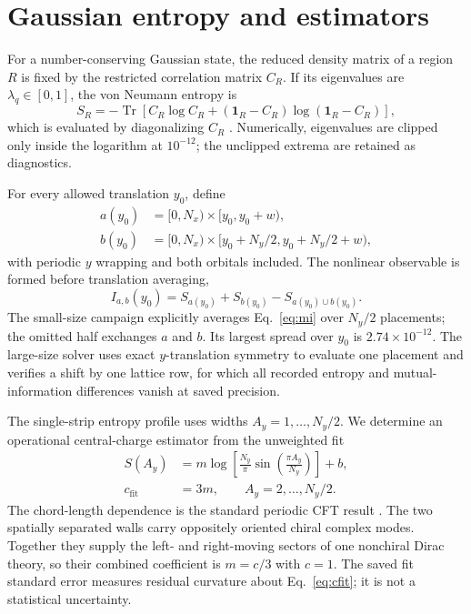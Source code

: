 \documentclass[aps,prb,twocolumn,nofootinbib,superscriptaddress,floatfix]{revtex4-2}
\newcommand{\Tr}{\operatorname{Tr}}
\newcommand{\cfit}{c_{\mathrm{fit}}}
\newcommand{\Iab}{I_{a,b}}
\begin{document}
\section{Gaussian entropy and estimators}
\label{sec:estimators}

For a number-conserving Gaussian state, the reduced density matrix of a region
$R$ is fixed by the restricted correlation matrix $C_R$.  If its eigenvalues
are $\lambda_q\in[0,1]$, the von Neumann entropy is
\begin{equation}
 S_R=-\Tr\left[C_R\log C_R+
 (\mathbf{1}_R-C_R)\log(\mathbf{1}_R-C_R)\right],
 \label{eq:gaussianentropy}
\end{equation}
which is evaluated by diagonalizing $C_R$ \cite{Peschel2003,PeschelEisler2009}.
Numerically, eigenvalues are clipped only inside the logarithm at
$10^{-12}$; the unclipped extrema are retained as diagnostics.

For every allowed translation $y_0$, define
\begin{align}
 a(y_0)&=[0,N_x)\times[y_0,y_0+w),
 \\
 b(y_0)&=[0,N_x)\times
 [y_0+N_y/2,y_0+N_y/2+w),
 \label{eq:strips}
\end{align}
with periodic $y$ wrapping and both orbitals included.  The nonlinear
observable is formed before translation averaging,
\begin{equation}
 \Iab(y_0)=S_{a(y_0)}+S_{b(y_0)}-S_{a(y_0)\cup b(y_0)}.
 \label{eq:mi}
\end{equation}
The small-size campaign explicitly averages Eq.~\eqref{eq:mi} over
$N_y/2$ placements; the omitted half exchanges $a$ and $b$.  Its largest
spread over $y_0$ is $2.74\times10^{-12}$.  The large-size solver uses exact
$y$-translation symmetry to evaluate one placement and verifies a shift by
one lattice row, for which all recorded entropy and mutual-information
differences vanish at saved precision.

The single-strip entropy profile uses widths
$A_y=1,\ldots,N_y/2$.  We determine an operational central-charge estimator
from the unweighted fit
\begin{align}
 S(A_y)&=m\log\left[
 \frac{N_y}{\pi}\sin\left(\frac{\pi A_y}{N_y}\right)
 \right]+b,
 \\
 \cfit&=3m,
 \qquad A_y=2,\ldots,N_y/2.
 \label{eq:cfit}
\end{align}
The chord-length dependence is the standard periodic CFT result
\cite{CalabreseCardy2004}.  The two spatially separated walls carry oppositely
oriented chiral complex modes.  Together they supply the left- and right-moving
sectors of one nonchiral Dirac theory, so their combined coefficient is
$m=c/3$ with $c=1$.  The saved fit standard error measures residual curvature
about Eq.~\eqref{eq:cfit}; it is not a statistical uncertainty.
\end{document}
